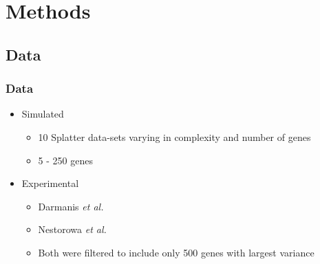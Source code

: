 \documentclass{beamer}
\begin{document}



\section{Methods}

\subsection{Data}

\begin{frame}
\frametitle{Data}
\begin{itemize}
    \item Simulated
    \begin{itemize}
        \item 10 Splatter data-sets varying in complexity and number of genes 
        \item 5 - 250 genes
    \end{itemize}
    \item Experimental
    \begin{itemize}
        \item Darmanis \textit{et al.} \cite{darmanis2015survey}
        \item Nestorowa \textit{et al.} \cite{nestorowa2016single}
        \item Both were filtered to include only 500 genes with largest variance
    \end{itemize}
\end{itemize}
\end{frame}
\end{document}
